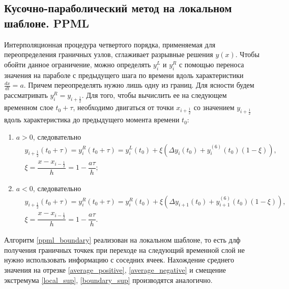 \documentclass[12pt,a4paper]{article}
\newcommand{\half}{\frac{1}{2}}
\begin{document}
    \subsection{Кусочно-параболический метод на локальном шаблоне. PPML}

    Интерполяционная процедура четвертого порядка, применяемая для переопределения граничных узлов, сглаживает разрывные решения $y(x)$. Чтобы обойти данное ограничение, можно определять $ y_i^L $ и $ y_i^R $ с помощью переноса значения на параболе с предыдущего шага по времени вдоль характеристики $ \frac{dx}{dt} = a $. Причем переопределять нужно лишь одну из границ. Для ясности  будем рассматривать $y_i^R = y_{i+\half}$. Для того, чтобы вычислить ее на следующем временном слое $ t_0 + \tau $, необходимо двигаться от точки $ x_{i+\half} $ со значением $ y_{i+\half} $ вдоль характеристика до предыдущего момента времени $ t_0 $:
    \begin{enumerate}
        \item $ a > 0 $, следовательно
        \begin{equation}
            \label{ppml_boundary}
            \begin{split}
                &y_{i+\half}(t_0 + \tau) = y_i^R(t_0 + \tau) = y_i^L(t_0) + \xi(\Delta y_i(t_0) + y_i^{(6)}(t_0)(1-\xi)), \\[0.7em]
                &\xi = \dfrac{x - x_{i-\half}}{h} = 1 -  \dfrac{a \tau}{h};
            \end{split}
        \end{equation}

        \item $ a < 0 $, следовательно
        \[
            \begin{split}
                &y_{i+\half}(t_0 + \tau) = y_i^R(t_0 + \tau) = y_i^R(t_0) + \xi(\Delta y_{i+1}(t_0) + y_{i+1}^{(6)}(t_0)(1-\xi)), \\[0.7em]
                &\xi = \dfrac{x - x_{i-\half}}{h} = 1 -  \dfrac{a \tau}{h}.
            \end{split}  
        \]
    \end{enumerate}

    Алгоритм \eqref{ppml_boundary} реализован на локальном шаблоне, то есть длф получения граничных точкек при переходе на следующий временной слой не нужно использовать информацию с соседних ячеек. Нахождение среднего значения на отрезке \eqref{average_positive}, \eqref{average_negative} и смещение экстремума \eqref{local_sup}, \eqref{boundary_sup} производятся аналогично.
\end{document}
